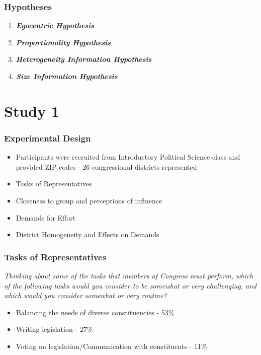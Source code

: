 \documentclass[14pt]{beamer}
\newcommand\e{\emph}
\newcommand\tb{\textbf}
\begin{document}
\begin{frame}
\frametitle{Hypotheses}
\begin{enumerate}
	\item \tb{\e{Egocentric Hypothesis}} 
	\item \tb{\e{Proportionality Hypothesis}}
	\item \tb{\e{Heterogeneity Information Hypothesis}} 
	\item \tb{\e{Size Information Hypothesis}} 
\end{enumerate}
\end{frame}

\section{Study 1}
\begin{frame}
\frametitle{Experimental Design}
\begin{itemize}
	\item Participants were recruited from Introductory Political Science class and provided ZIP codes - 26 congressional districts represented
	\item Tasks of Representatives
	\item Closeness to group and perceptions of influence
	\item Demands for Effort
	\item District Homogeneity and Effects on Demands 
\end{itemize}
\end{frame}

\begin{frame}
\frametitle{Tasks of Representatives}
\small
\begin{center}
	\e{Thinking about some of the tasks that members of Congress must perform, which of the following tasks would you consider to be somewhat or very challenging, and which would you consider somewhat or very routine?}
\end{center}
\begin{itemize}
	\item Balancing the needs of diverse constituencies - 53\% 
	\item Writing legislation - 27\%
	\item Voting on legislation/Communication with constituents - 11\%
\end{itemize}
\end{frame}
\end{document}
